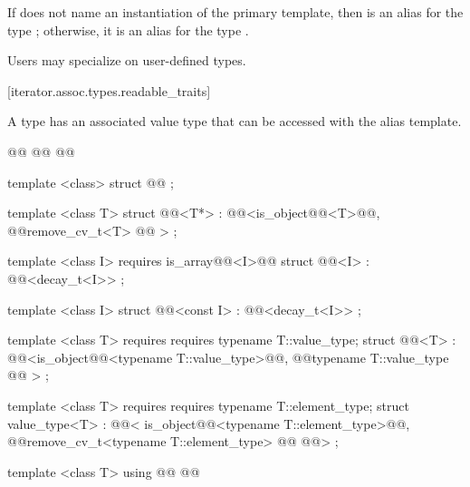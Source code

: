 \begin{addedblock}
\pnum
If  does not name an instantiation of the primary
template, then 
is an alias for the type ; otherwise,
it is an alias for the type .
\end{addedblock}

\pnum
Users may specialize 
on user-defined types.

[iterator.assoc.types.readable_traits]{}

\pnum
A  type has an associated value type that can be accessed with the
 alias template.

%
\begin{codeblock}
  @@
    @@
  @\added{\};}@

  template <class> struct @@ { };

  template <class T>
  struct @@<T*>
    : @@<is_object@@<T>@@,
        @@remove_cv_t<T> @@ > { };

  template <class I>
    requires is_array@@<I>@@
  struct @@<I>
    : @@<decay_t<I>> { };

  template <class I>
  struct @@<const I>
    : @@<decay_t<I>> { };

  template <class T>
    requires requires { typename T::value_type; }
  struct @@<T>
    : @@<is_object@@<typename T::value_type>@@,
        @@typename T::value_type @@ > { };

  template <class T>
    requires requires { typename T::element_type; }
  struct value_type<T>
    : @@<
        is_object@@<typename T::element_type>@@,
        @@remove_cv_t<typename T::element_type> @\added{>,}@
        @@>
    { };

  template <class T> using @@
    @@
\end{codeblock}

